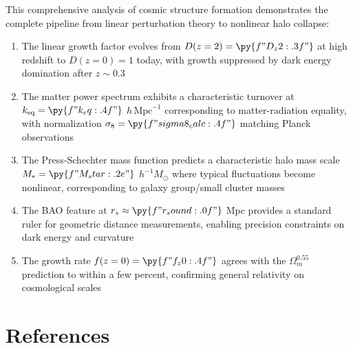 \documentclass[a4paper, 11pt]{article}
\begin{document}
This comprehensive analysis of cosmic structure formation demonstrates the complete pipeline
from linear perturbation theory to nonlinear halo collapse:

\begin{enumerate}
\item The linear growth factor evolves from $D(z=2) = \py{f"{D_z2:.3f}"}$ at high redshift to
$D(z=0) = 1$ today, with growth suppressed by dark energy domination after $z \sim 0.3$

\item The matter power spectrum exhibits a characteristic turnover at
$k_{\text{eq}} = \py{f"{k_eq:.4f}"}$ $h\,\text{Mpc}^{-1}$ corresponding to matter-radiation
equality, with normalization $\sigma_8 = \py{f"{sigma8_calc:.4f}"}$ matching Planck observations

\item The Press-Schechter mass function predicts a characteristic halo mass scale
$M_* = \py{f"{M_star:.2e}"}$ $h^{-1}M_{\odot}$ where typical fluctuations become nonlinear,
corresponding to galaxy group/small cluster masses

\item The BAO feature at $r_s \approx \py{f"{r_sound:.0f}"}$ Mpc provides a standard ruler for
geometric distance measurements, enabling precision constraints on dark energy and curvature

\item The growth rate $f(z=0) = \py{f"{f_z0:.4f}"}$ agrees with the $\Omega_m^{0.55}$ prediction
to within a few percent, confirming general relativity on cosmological scales
\end{enumerate}

\section*{References}
\end{document}
